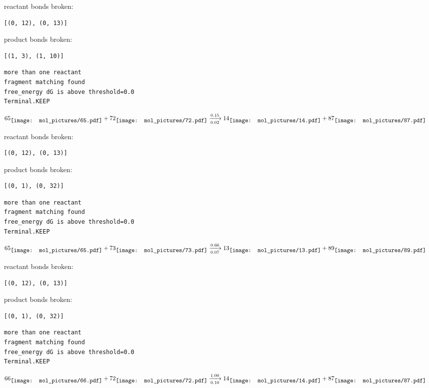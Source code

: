 \documentclass{article}
\begin{document}
reactant bonds broken:\begin{verbatim}
[(0, 12), (0, 13)]
\end{verbatim}
product bonds broken:\begin{verbatim}
[(1, 3), (1, 10)]
\end{verbatim}




\vspace{1cm}
\begin{verbatim}
more than one reactant
fragment matching found
free_energy dG is above threshold=0.0
Terminal.KEEP
\end{verbatim}
$$
65
\raisebox{-.5\height}{\texttt{[image: mol\_pictures/65.pdf]}}
+
72
\raisebox{-.5\height}{\texttt{[image: mol\_pictures/72.pdf]}}
\xrightarrow[0.02]{0.15}
14
\raisebox{-.5\height}{\texttt{[image: mol\_pictures/14.pdf]}}
+
87
\raisebox{-.5\height}{\texttt{[image: mol\_pictures/87.pdf]}}
$$


reactant bonds broken:\begin{verbatim}
[(0, 12), (0, 13)]
\end{verbatim}
product bonds broken:\begin{verbatim}
[(0, 1), (0, 32)]
\end{verbatim}




\vspace{1cm}
\begin{verbatim}
more than one reactant
fragment matching found
free_energy dG is above threshold=0.0
Terminal.KEEP
\end{verbatim}
$$
65
\raisebox{-.5\height}{\texttt{[image: mol\_pictures/65.pdf]}}
+
73
\raisebox{-.5\height}{\texttt{[image: mol\_pictures/73.pdf]}}
\xrightarrow[0.07]{0.66}
13
\raisebox{-.5\height}{\texttt{[image: mol\_pictures/13.pdf]}}
+
89
\raisebox{-.5\height}{\texttt{[image: mol\_pictures/89.pdf]}}
$$


reactant bonds broken:\begin{verbatim}
[(0, 12), (0, 13)]
\end{verbatim}
product bonds broken:\begin{verbatim}
[(0, 1), (0, 32)]
\end{verbatim}




\vspace{1cm}
\begin{verbatim}
more than one reactant
fragment matching found
free_energy dG is above threshold=0.0
Terminal.KEEP
\end{verbatim}
$$
66
\raisebox{-.5\height}{\texttt{[image: mol\_pictures/66.pdf]}}
+
72
\raisebox{-.5\height}{\texttt{[image: mol\_pictures/72.pdf]}}
\xrightarrow[0.10]{1.00}
14
\raisebox{-.5\height}{\texttt{[image: mol\_pictures/14.pdf]}}
+
87
\raisebox{-.5\height}{\texttt{[image: mol\_pictures/87.pdf]}}
$$
\end{document}
